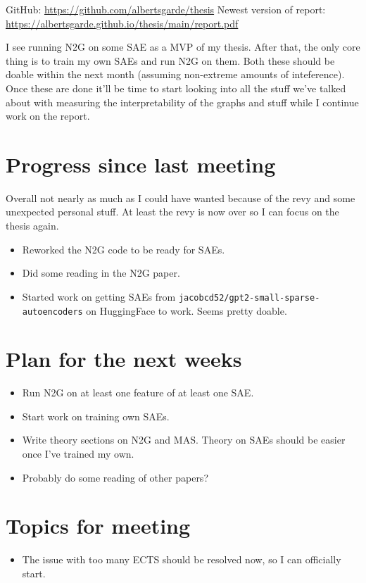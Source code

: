 \documentclass[main.tex]{subfiles}
\begin{document}
GitHub: \url{https://github.com/albertsgarde/thesis}
Newest version of report: \url{https://albertsgarde.github.io/thesis/main/report.pdf}

I see running N2G on some SAE as a MVP of my thesis.
After that, the only core thing is to train my own SAEs and run N2G on them.
Both these should be doable within the next month (assuming non-extreme amounts of inteference).
Once these are done it'll be time to start looking into all the stuff we've talked about with measuring the interpretability of the graphs and stuff while I continue work on the report.

\section*{Progress since last meeting}
Overall not nearly as much as I could have wanted because of the revy and some unexpected personal stuff.
At least the revy is now over so I can focus on the thesis again.
\begin{itemize}
    \item Reworked the N2G code to be ready for SAEs.
    \item Did some reading in the N2G paper.
    \item Started work on getting SAEs from \verb|jacobcd52/gpt2-small-sparse-autoencoders| on HuggingFace to work.
    Seems pretty doable.
\end{itemize}
\section*{Plan for the next weeks}
\begin{itemize}
    \item Run N2G on at least one feature of at least one SAE.
    \item Start work on training own SAEs.
    \item Write theory sections on N2G and MAS.
    Theory on SAEs should be easier once I've trained my own.
    \item Probably do some reading of other papers?
\end{itemize}
\section*{Topics for meeting}
\begin{itemize}
    \item The issue with too many ECTS should be resolved now, so I can officially start.
\end{itemize}
\end{document}
